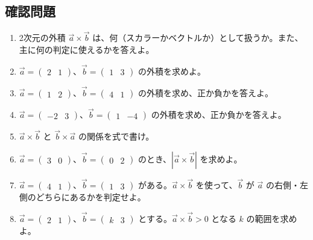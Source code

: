 \documentclass[paper=a4,fleqn,11pt]{jlreq}
\begin{document}
\subsection{確認問題}
\begin{enumerate}
  \item 2次元の外積 \(\vec{a}\times\vec{b}\) は、何（スカラーかベクトルか）として扱うか。また、主に何の判定に使えるかを答えよ。
  \item \(\vec{a}=\begin{pmatrix}2 & 1\end{pmatrix}\)、\(\vec{b}=\begin{pmatrix}1 & 3\end{pmatrix}\) の外積を求めよ。
  \item \(\vec{a}=\begin{pmatrix}1 & 2\end{pmatrix}\)、\(\vec{b}=\begin{pmatrix}4 & 1\end{pmatrix}\) の外積を求め、正か負かを答えよ。
  \item \(\vec{a}=\begin{pmatrix}-2 & 3\end{pmatrix}\)、\(\vec{b}=\begin{pmatrix}1 & -4\end{pmatrix}\) の外積を求め、正か負かを答えよ。
  \item \(\vec{a}\times\vec{b}\) と \(\vec{b}\times\vec{a}\) の関係を式で書け。
  \item \(\vec{a}=\begin{pmatrix}3 & 0\end{pmatrix}\)、\(\vec{b}=\begin{pmatrix}0 & 2\end{pmatrix}\) のとき、\(|\vec{a}\times\vec{b}|\) を求めよ。
  \item \(\vec{a}=\begin{pmatrix}4 & 1\end{pmatrix}\)、\(\vec{b}=\begin{pmatrix}1 & 3\end{pmatrix}\) がある。\(\vec{a}\times\vec{b}\) を使って、\(\vec{b}\) が \(\vec{a}\) の右側・左側のどちらにあるかを判定せよ。
  \item \(\vec{a}=\begin{pmatrix}2 & 1\end{pmatrix}\)、\(\vec{b}=\begin{pmatrix}k & 3\end{pmatrix}\) とする。\(\vec{a}\times\vec{b}>0\) となる \(k\) の範囲を求めよ。
\end{enumerate}
\end{document}
